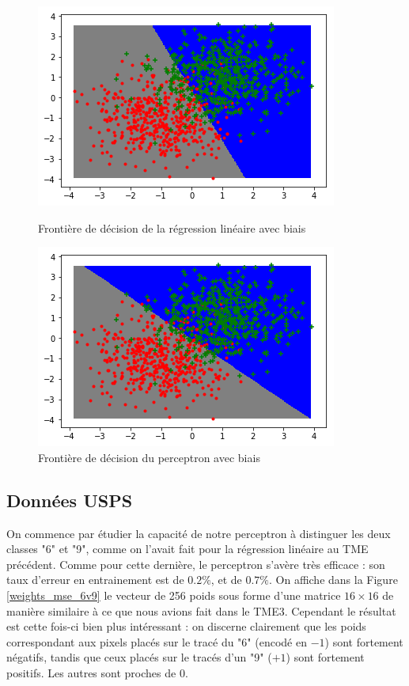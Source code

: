 \documentclass[a4paper]{article}
\begin{document}
\begin{figure}[ht!]
\begin{center}
\begin{minipage}{0.45\textwidth}
\includegraphics[scale=0.5]{frontiere_mse_biais.png}
\caption{Frontière de décision de la régression linéaire avec biais}
\label{frontiere_mse_biais}
\end{minipage}\hfill
\begin{minipage}{0.45\textwidth}
\includegraphics[scale=0.5]{frontiere_hinge_biais.png}
\caption{Frontière de décision du perceptron avec biais}
\label{frontiere_hinge_biais}
\end{minipage}
\end{center}
\end{figure}

\subsection*{Données USPS}

On commence par étudier la capacité de notre perceptron à distinguer les deux classes "6" et "9", comme on l'avait fait pour la régression linéaire au TME précédent. Comme pour cette dernière, le perceptron s'avère très efficace : son taux d'erreur en entrainement est de $0.2\%$, et de $0.7\%$. On affiche dans la Figure \ref{weights_mse_6v9} le vecteur de 256 poids sous forme d'une matrice $16 \times 16$ de manière similaire à ce que nous avions fait dans le TME3. Cependant le résultat est cette fois-ci bien plus intéressant : on discerne clairement que les poids correspondant aux pixels placés sur le tracé du "6" (encodé en $-1$) sont fortement négatifs, tandis que ceux placés sur le tracés d'un "9" ($+1$) sont fortement positifs. Les autres sont proches de 0.
\end{document}
